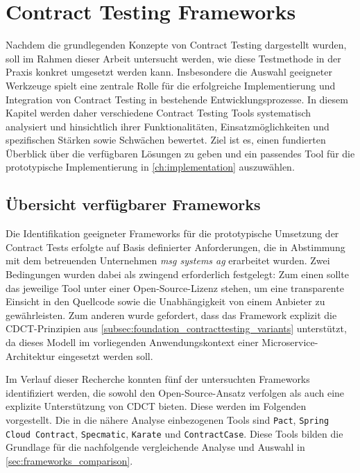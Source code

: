 \chapter{Contract Testing Frameworks}\label{ch:frameworks}

Nachdem die grundlegenden Konzepte von Contract Testing dargestellt wurden, soll im Rahmen dieser Arbeit untersucht werden, wie diese Testmethode in der Praxis konkret umgesetzt werden kann.
Insbesondere die Auswahl geeigneter Werkzeuge spielt eine zentrale Rolle für die erfolgreiche Implementierung und Integration von Contract Testing in bestehende Entwicklungsprozesse.
In diesem Kapitel werden daher verschiedene Contract Testing Tools systematisch analysiert und hinsichtlich ihrer Funktionalitäten, Einsatzmöglichkeiten und spezifischen Stärken sowie Schwächen bewertet.
Ziel ist es, einen fundierten Überblick über die verfügbaren Lösungen zu geben und ein passendes Tool für die prototypische Implementierung in \cref{ch:implementation} auszuwählen.

\section{Übersicht verfügbarer Frameworks}\label{sec:frameworks_overview}

Die Identifikation geeigneter Frameworks für die prototypische Umsetzung der Contract Tests erfolgte auf Basis definierter Anforderungen, die in Abstimmung mit dem betreuenden Unternehmen \textit{msg systems ag} erarbeitet wurden.
Zwei Bedingungen wurden dabei als zwingend erforderlich festgelegt:
Zum einen sollte das jeweilige Tool unter einer Open-Source-Lizenz stehen, um eine transparente Einsicht in den Quellcode sowie die Unabhängigkeit von einem Anbieter zu gewährleisten.
Zum anderen wurde gefordert, dass das Framework explizit die \gls{CDCT}-Prinzipien aus \cref{subsec:foundation_contracttesting_variants} unterstützt, da dieses Modell im vorliegenden Anwendungskontext einer Microservice-Architektur eingesetzt werden soll.

Im Verlauf dieser Recherche konnten fünf der untersuchten Frameworks identifiziert werden, die sowohl den Open-Source-Ansatz verfolgen als auch eine explizite Unterstützung von \gls{CDCT} bieten.
Diese werden im Folgenden vorgestellt.
Die in die nähere Analyse einbezogenen Tools sind \texttt{Pact}, \texttt{Spring Cloud Contract}, \texttt{Specmatic}, \texttt{Karate} und \texttt{ContractCase}.
Diese Tools bilden die Grundlage für die nachfolgende vergleichende Analyse und Auswahl in \cref{sec:frameworks_comparison}.

